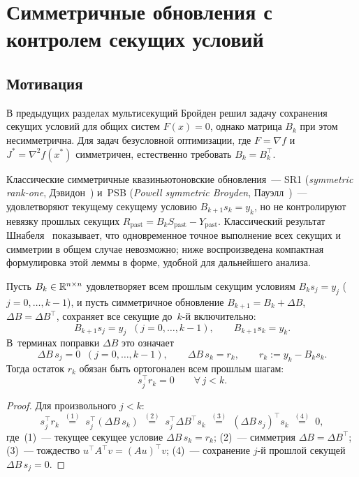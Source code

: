 \chapter{Симметричные обновления с контролем секущих условий}\label{ch:symmetric}

\section{Мотивация}\label{sec:ss_motivation}

В предыдущих разделах мультисекущий Бройден решил задачу сохранения
секущих условий для общих систем $F(x) = 0$, однако матрица $B_k$ при
этом несимметрична. Для задач безусловной оптимизации,
где $F = \nabla f$ и $J^* = \nabla^2 f(x^*)$ симметричен, естественно
требовать $B_k = B_k^\top$.

Классические симметричные квазиньютоновские обновления~---
SR1 (\emph{symmetric rank-one}, Дэвидон~\cite{davidon1991}) и~PSB
(\emph{Powell symmetric Broyden}, Пауэлл~\cite{powell1970})~---
удовлетворяют текущему секущему условию $B_{k+1} s_k = y_k$,
но не контролируют невязку прошлых секущих
$R_{\mathrm{past}} = B_k S_{\mathrm{past}} - Y_{\mathrm{past}}$.
Классический результат Шнабеля~\cite{schnabel1983} показывает,
что одновременное точное выполнение всех секущих и симметрии
в общем случае невозможно; ниже воспроизведена компактная
формулировка этой леммы в форме, удобной для дальнейшего анализа.

\begin{lemma}\label{lem:incompat}
Пусть $B_k\in\mathbb{R}^{n\times n}$ удовлетворяет всем прошлым секущим
условиям $B_k s_j = y_j$ ($j=0,\dots,k-1$), и пусть симметричное
обновление $B_{k+1} = B_k + \Delta B$, $\Delta B = \Delta B^\top$,
сохраняет все секущие до~$k$-й включительно:
\[
  B_{k+1} s_j = y_j \;\;(j = 0,\dots,k-1),
  \qquad B_{k+1} s_k = y_k.
\]
В~терминах поправки $\Delta B$ это означает
\[
  \Delta B\, s_j = 0 \;\;(j=0,\dots,k-1),
  \qquad \Delta B\, s_k = r_k,
  \qquad r_k := y_k - B_k s_k.
\]
Тогда остаток $r_k$ обязан быть ортогонален всем прошлым шагам:
\begin{equation}\label{eq:incompat}
  s_j^\top r_k = 0 \qquad \forall\, j < k.
\end{equation}
\end{lemma}

\begin{proof}
Для произвольного $j < k$:
\begin{equation}\label{eq:incompat-chain}
  s_j^\top r_k
  \;\stackrel{(1)}{=}\; s_j^\top (\Delta B\, s_k)
  \;\stackrel{(2)}{=}\; s_j^\top \Delta B^\top s_k
  \;\stackrel{(3)}{=}\; (\Delta B\, s_j)^\top s_k
  \;\stackrel{(4)}{=}\; 0,
\end{equation}
где~(1)~--- текущее секущее условие $\Delta B\, s_k = r_k$;
(2)~--- симметрия $\Delta B = \Delta B^\top$;
(3)~--- тождество $u^\top A^\top v = (A u)^\top v$;
(4)~--- сохранение $j$-й прошлой секущей $\Delta B\, s_j = 0$.
\end{proof}

